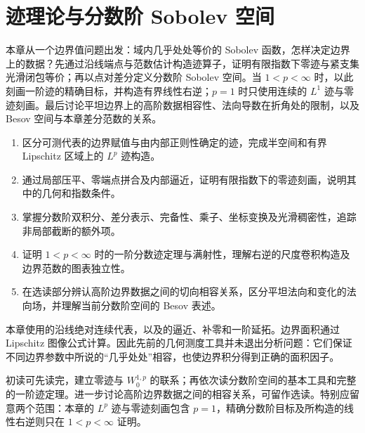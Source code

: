 \chapter{迹理论与分数阶 Sobolev 空间}
\label{b1:ch:23}
\begin{chapterabstract}
本章从一个边界值问题出发：域内几乎处处等价的 Sobolev 函数，怎样决定边界上的数据？先通过沿线端点与范数估计构造迹算子，证明有限指数下零迹与紧支集光滑闭包等价；再以点对差分定义分数阶 Sobolev 空间。当 \(1<p<\infty\) 时，以此刻画一阶迹的精确目标，并构造有界线性右逆；\(p=1\) 时只使用连续的 \(L^1\) 迹与零迹刻画。最后讨论平坦边界上的高阶数据相容性、法向导数在折角处的限制，以及 Besov 空间与本章差分范数的关系。
\end{chapterabstract}

\begin{learninggoals}
\begin{enumerate}
\item\label{b1:goal:23-trace}区分可测代表的边界赋值与由内部正则性确定的迹，完成半空间和有界 Lipschitz 区域上的 \(L^p\) 迹构造。
\item\label{b1:goal:23-zero}通过局部压平、零端点拼合及内部逼近，证明有限指数下的零迹刻画，说明其中的几何和指数条件。
\item\label{b1:goal:23-fractional}掌握分数阶双积分、差分表示、完备性、乘子、坐标变换及光滑稠密性，追踪非局部截断的额外项。
\item\label{b1:goal:23-boundary-space}证明 \(1<p<\infty\) 时的一阶分数迹定理与满射性，理解右逆的尺度卷积构造及边界范数的图表独立性。
\item\label{b1:goal:23-higher}在选读部分辨认高阶边界数据之间的切向相容关系，区分平坦法向和变化的法向场，并理解当前分数阶空间的 Besov 表述。
\end{enumerate}
\end{learninggoals}

本章使用的沿线绝对连续代表，以及的逼近、补零和一阶延拓。边界面积通过 Lipschitz 图像公式计算。因此先前的几何测度工具并未退出分析问题：它们保证不同边界参数中所说的“几乎处处”相容，也使边界积分得到正确的面积因子。

\ProseParagraphBreak

初读可先读完，建立零迹与 \(W_0^{1,p}\) 的联系；再依次读分数阶空间的基本工具和完整的一阶迹定理。进一步讨论高阶边界数据之间的相容关系，可留作选读。特别应留意两个范围：本章的 \(L^p\) 迹与零迹刻画包含 \(p=1\)，精确分数阶目标及所构造的线性右逆则只在 \(1<p<\infty\) 证明。

